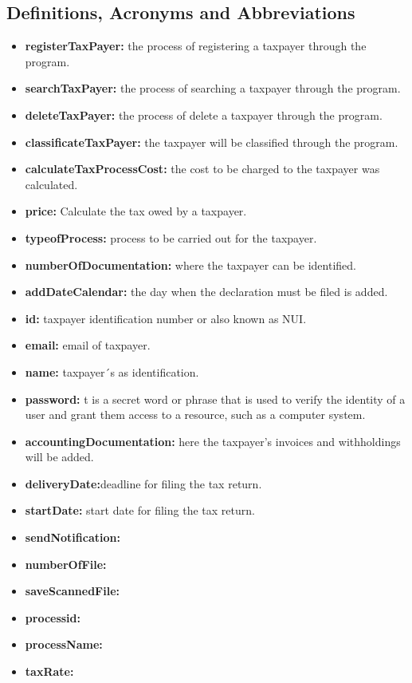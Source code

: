 \documentclass[12pt,a4paper, twosite]{article}
\begin{document}
\subsection{Definitions, Acronyms and Abbreviations}
\label{sec:orgb158e36}
\begin{itemize}
    \item \textbf{registerTaxPayer:} the process of registering a taxpayer through the program.
    \item \textbf{searchTaxPayer:} the process of searching a taxpayer through the program.
    \item \textbf{deleteTaxPayer:} the process of delete a taxpayer through the program.
    \item \textbf{classificateTaxPayer:} the taxpayer will be classified through the program.
    \item \textbf{calculateTaxProcessCost:} the cost to be charged to the taxpayer was calculated.
    \item \textbf{price:} Calculate the tax owed by a taxpayer.
    \item \textbf{typeofProcess:} process to be carried out for the taxpayer.
    \item \textbf{numberOfDocumentation:} where the taxpayer can be identified.
    \item \textbf{addDateCalendar:} the day when the declaration must be filed is added.
    \item \textbf{id:} taxpayer identification number or also known as NUI.
    \item \textbf{email:} email of taxpayer.
    \item \textbf{name:} taxpayer´s as identification.
    \item \textbf{password:} t is a secret word or phrase that is used to verify the identity of a user and grant them access to a resource, such as a computer system.
    \item \textbf{accountingDocumentation:} here the taxpayer's invoices and withholdings will be added.
    \item \textbf{deliveryDate:}deadline for filing the tax return.
    \item \textbf{startDate:} start date for filing the tax return.
    \item \textbf{sendNotification:}
    \item \textbf{numberOfFile:}
    \item \textbf{saveScannedFile:}
    \item \textbf{processid:}
    \item \textbf{processName:}
    \item \textbf{taxRate:}
\end{itemize}
\end{document}
